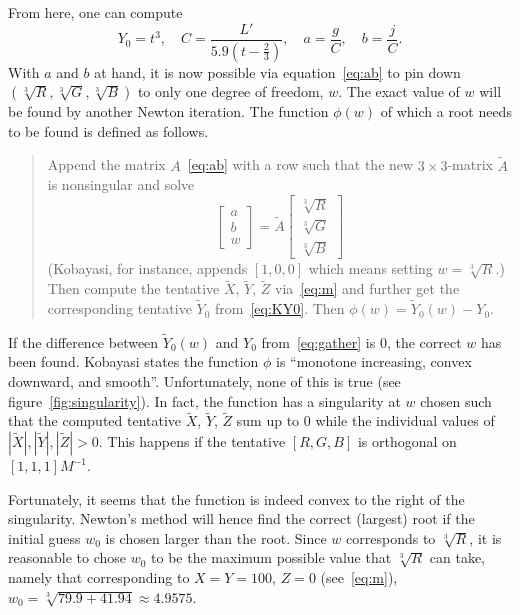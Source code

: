 \documentclass{scrartcl}
\theoremstyle{named}
\begin{document}
From here, one can compute
\begin{equation}\label{eq:gather}
  Y_0 = t^3,\quad
  C = \frac{L'}{5.9 \left(t - \frac{2}{3}\right)},\quad
  a = \frac{g}{C},\quad
  b = \frac{j}{C}.
\end{equation}
With $a$ and $b$ at hand, it is now possible via equation~\eqref{eq:ab} to pin down
$(\sqrt[3]{R}, \sqrt[3]{G}, \sqrt[3]{B})$ to only one degree of freedom, $w$.
The exact value of $w$ will be found by another Newton iteration. The function $\phi(w)$
of which a root needs to be found is defined as follows.
\begin{quotation}
  Append the matrix $A$~\eqref{eq:ab} with a row such that the new $3\times3$-matrix
  $\tilde{A}$ is nonsingular and solve
  \[
    \begin{bmatrix}
      a\\
      b\\
      w
    \end{bmatrix}
    =
    \tilde{A}
    \begin{bmatrix}
      \sqrt[3]{R}\\
      \sqrt[3]{G}\\
      \sqrt[3]{B}
    \end{bmatrix}
  \]
  (Kobayasi, for instance, appends $[1, 0, 0]$ which means setting $w=\sqrt[3]{R}$.)
  Then compute the tentative $\tilde{X}$, $\tilde{Y}$, $\tilde{Z}$ via~\eqref{eq:m} and
  further get the corresponding tentative $\tilde{Y}_0$ from~\eqref{eq:KY0}. Then
  $\phi(w) = \tilde{Y}_0(w) - Y_0$.
\end{quotation}

If the difference between $\tilde{Y}_0(w)$ and $Y_0$ from~\eqref{eq:gather} is 0, the
correct $w$ has been found.  Kobayasi states the function $\phi$ is ``monotone
increasing, convex downward, and smooth''. Unfortunately, none of this is true (see
figure~\ref{fig:singularity}). In fact, the function has a singularity at $w$ chosen
such that the computed tentative $\tilde{X}$, $\tilde{Y}$, $\tilde{Z}$ sum up to 0 while
the individual values of $|\tilde{X}|, |\tilde{Y}|, |\tilde{Z}| > 0$. This happens if
the tentative $[R, G, B]$ is orthogonal on $[1,1,1] M^{-1}$.

Fortunately, it seems that the function is indeed convex to the right of the
singularity.  Newton's method will hence find the correct (largest) root if the initial
guess $w_0$ is chosen larger than the root. Since $w$ corresponds to $\sqrt[3]{R}$, it
is reasonable to chose $w_0$ to be the maximum possible value that $\sqrt[3]{R}$ can
take, namely that corresponding to $X=Y=100$, $Z=0$ (see~\ref{eq:m}), $w_0=\sqrt[3]{79.9
+ 41.94}\approx 4.9575$.
\end{document}
